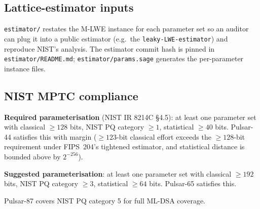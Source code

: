\subsection*{Lattice-estimator inputs}

\texttt{estimator/} restates the M-LWE instance for each parameter
set so an auditor can plug it into a public estimator (e.g.\ the
\texttt{leaky-LWE-estimator}) and reproduce NIST's analysis. The
estimator commit hash is pinned in \texttt{estimator/README.md};
\texttt{estimator/params.sage} generates the per-parameter instance
files.

\subsection*{NIST MPTC compliance}

\textbf{Required parameterisation} (NIST IR 8214C \S4.5): at least
one parameter set with classical $\geq 128$ bits, NIST PQ category
$\geq 1$, statistical $\geq 40$ bits. Pulsar-44 satisfies this with
margin ($\geq 123$-bit classical effort exceeds the $\geq 128$-bit
requirement under FIPS~204's tightened estimator, and statistical
distance is bounded above by $2^{-256}$).

\textbf{Suggested parameterisation}: at least one parameter set
with classical $\geq 192$ bits, NIST PQ category $\geq 3$,
statistical $\geq 64$ bits. Pulsar-65 satisfies this.

Pulsar-87 covers NIST PQ category 5 for full ML-DSA coverage.
